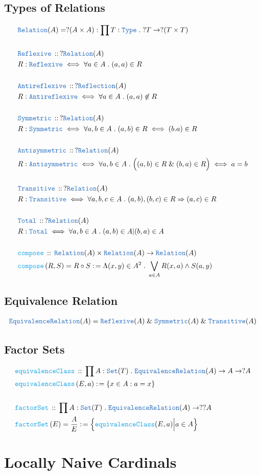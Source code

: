 \documentclass[12pt]{scrartcl}
\newcommand{\TYPE}[1]{\textcolor{NavyBlue}{\mathtt{#1}}}
\newcommand{\FUNC}[1]{\textcolor{Cerulean}{\mathtt{#1}}}
\renewcommand{\.}{\; . \;}
\newcommand{\de}{: \kern 0.1pc =}
\newcommand{\Act}[1]{\left( #1 \right)}
\newcommand{\DeclareType}[2]{& \TYPE{#1} \, :: \, #2 \\}
\newcommand{\DefineType}[3]{& #1 : \TYPE{#2} \iff #3 \\}
\newcommand{\DeclareFunc}[2]{& \FUNC{#1} \, :: \, #2 \\}
\newcommand{\DefineFunc}[3]{&  \FUNC{#1}\Act{#2} \de #3 \\}
\newcommand{\DefineNamedFunc}[4]{&  \FUNC{#1}\Act{#2} = #3 \de #4 \\}
\newcommand{\Page}[1]{ \begin{align*} #1 \end{align*}   }
\renewcommand{\And}{\; \& \;}
\newcommand{\Type}{\TYPE{Type}}
\newcommand{\Set}{\TYPE{Set}}
\begin{document}
\subsection{Types of Relations}
\Page{
	& \TYPE{Relation}(A) = ?(A \times A) : \prod T : \Type \. ?T \to ?(T \times T) \\
 \\
 \DeclareType{Reflexive}{ ?\TYPE{Relation}(A) }
 \DefineType{R}{Reflexive}{\forall a \in A \. (a,a) \in R}
 \\
 \DeclareType{Antireflexive}{ ?\TYPE{Reflection}(A)}
 \DefineType{R}{Antireflexive}{ \forall a \in A \. (a,a) \not \in R}
 \\
 \DeclareType{Symmetric}{?\TYPE{Relation}(A)}
 \DefineType{R}{Symmetric}{\forall a,b \in A \. (a,b) \in R \iff (b.a) \in R }
 \\
 \DeclareType{Antisymmetric}{?\TYPE{Relation}(A)}
 \DefineType{R}{Antisymmetric}{\forall a,b \in A \. \Big( (a,b) \in R \And (b,a) \in R \Big) \iff a = b}
 \\
 \DeclareType{Transitive}{?\TYPE{Relation}(A)}
 \DefineType{R}{Transitive}{\forall a,b,c \in A \. (a,b),(b,c) \in R \Rightarrow (a,c) \in R}
 \\
 \DeclareType{Total}{?\TYPE{Relation}(A)}
 \DefineType{R}{Total}{ \forall a,b \in A \. (a,b) \in A | (b,a) \in A} 
 \\
 \DeclareFunc{compose}{ \TYPE{Relation}(A) \times \TYPE{Relation}(A) \to \TYPE{Relation}(A)}
 \DefineNamedFunc{compose}{ R,S}{ R \circ S}{ \Lambda (x,y) \in A^2 \.  \bigvee_{a \in A} R(x,a) \wedge S(a,y) }
}
\subsection{Equivalence Relation}
\Page{
	& \TYPE{EquivalenceRelation}(A) = \TYPE{Reflexive}(A) \And \TYPE{Symmetric}(A) \And \TYPE{Transitive}(A)  \\
}
\subsection{Factor Sets}
\Page{
	\DeclareFunc{equivalenceClass}{ \prod A : \Set(T) \. \TYPE{EquivalenceRelation}(A) \to A \to ?A }
	\DefineFunc{equivalenceClass}{E,a }{ \{  x \in A : a = x   \} }
	\\
	\DeclareFunc{factorSet}{ \prod A : \Set(T) \. \TYPE{EquivalenceRelation}(A) \to ??A  }
	\DefineNamedFunc{factorSet}{E}{\frac{A}{E}}{ \Big\{ \FUNC{equivalenceClass}(E,a) \Big| a \in A    \Big\}  }
}
\section{Locally Naive Cardinals}
\end{document}
